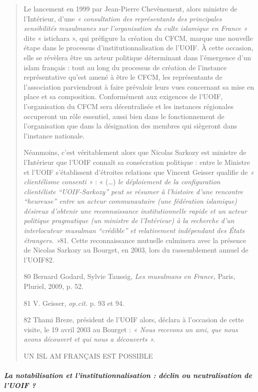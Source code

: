 \begin{quote}
Le lancement en 1999 par Jean-Pierre Chevènement, alors ministre de
l'Intérieur, d'une \emph{« consultation des représentants des
principales sensibilités musulmanes sur l'organisation du culte
islamique en France »} dite « istichara », qui préfigure la création du
CFCM, marque une nouvelle étape dans le processus
d'institutionnalisation de l'UOIF. À cette occasion, elle se révèlera
être un acteur politique déterminant dans l'émergence d'un islam
français : tout au long du processus de création de l'instance
représentative qu'est amené à être le CFCM, les représentants de
l'association parviendront à faire prévaloir leurs vues concernant sa
mise en place et sa composition. Conformément aux exigences de l'UOIF,
l'organisation du CFCM sera décentralisée et les instances régionales
occuperont un rôle essentiel, aussi bien dans le fonctionnement de
l'organisation que dans la désignation des membres qui siègeront dans
l'instance nationale.

Néanmoins, c'est véritablement alors que Nicolas Sarkozy est ministre de
l'Intérieur que l'UOIF connaît sa consécration politique : entre le
Ministre et l'UOIF s'établissent d'étroites relations que Vincent
Geisser qualifie de \emph{« clientélisme consenti »} : « (\ldots)
\emph{le déploiement de la configuration clientéliste ``UOIF-Sarkozy''
peut se résumer à l'histoire d'une rencontre ``heureuse'' entre un
acteur communautaire (une fédération islamique) désireux d'obtenir une
reconnaissance institutionnelle rapide et un acteur politique
pragmatique (un ministre de l'Intérieur) à la recherche d'un
interlocuteur musulman ``crédible'' et relativement indépendant des
États étrangers. »}81. Cette reconnaissance mutuelle culminera avec la
présence de Nicolas Sarkozy au Bourget, en 2003, lors du rassemblement
annuel de l'UOIF82.

80 Bernard Godard, Sylvie Taussig, \emph{Les musulmans en France,}
Paris, Pluriel, 2009, p. 52.

81 V. Geisser, \emph{op.cit.} p. 93 et 94.

82 Thami Breze, président de l'UOIF alors, déclara à l'occasion de cette
visite, le 19 avril 2003 au Bourget : \emph{« Nous recevons un ami, que
nous avons découvert et qui nous a découverts ».}

UN ISL AM FRANÇAIS EST POSSIBLE
\end{quote}

\hypertarget{la-notabilisation-et-linstitutionnalisation-duxe9clin-ou-neutralisation-de-luoif}{%
\subparagraph{La notabilisation et l'institutionnalisation : déclin ou
neutralisation de l'UOIF
?}\label{la-notabilisation-et-linstitutionnalisation-duxe9clin-ou-neutralisation-de-luoif}}

